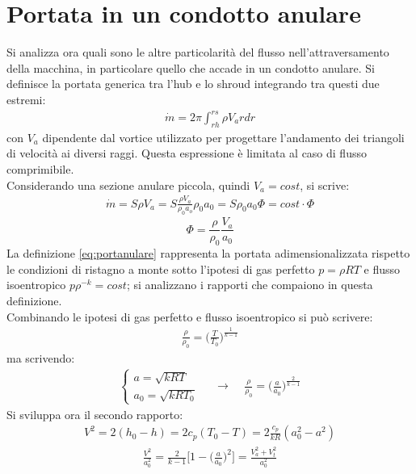 \section{Portata in un condotto anulare}
Si analizza ora quali sono le altre particolarità del flusso nell'attraversamento della macchina, in particolare quello che accade in un condotto anulare. Si definisce la portata generica tra l'hub e lo shroud integrando tra questi due estremi:
\begin{align*}
\dot{m} = 2 \pi \int_{rh}^{rs} \rho V_a r dr
\end{align*}
con $V_a$ dipendente dal vortice utilizzato per progettare l'andamento dei triangoli di velocità ai diversi raggi. Questa espressione è limitata al caso di flusso comprimibile.\\
Considerando una sezione anulare piccola, quindi $V_a = cost$, si scrive:
\begin{align*}
\dot{m} = S \rho V_a = S \frac{\rho V_a}{\rho_0 a_o}\rho_0 a_0 = S \rho_0 a_0 \Phi = cost \cdot \Phi
\end{align*}
\begin{equation}\label{eq:portanulare}
\Phi = \frac{\rho}{\rho_0} \frac{V_a}{a_0}
\end{equation}
La definizione \ref{eq:portanulare} rappresenta la portata adimensionalizzata rispetto le condizioni di ristagno a monte sotto l'ipotesi di gas perfetto $p = \rho RT$ e flusso isoentropico $p \rho^{-k} = cost$; si analizzano i rapporti che compaiono in questa definizione.\\
Combinando le ipotesi di gas perfetto e flusso isoentropico si può scrivere:
\begin{align*}
\frac{\rho}{\rho_0} = \bigg( \frac{T}{T_0} \bigg)^{\frac{1}{k-1}} 
\end{align*}
ma scrivendo:
\begin{align*}
\begin{cases}
a = \sqrt{kRT}\\
a_0 = \sqrt{kRT_0}
\end{cases}
\;\;\;\; \rightarrow \;\;\;\; \frac{\rho}{\rho_0} = \bigg( \frac{a}{a_0} \bigg)^{\frac{2}{k-1}}
\end{align*}
Si sviluppa ora il secondo rapporto:
\begin{align*}
V^2 = 2 (h_0 - h) = 2 c_p (T_0 - T) = 2 \frac{c_p}{kR} (a_0^2 - a^2)
\end{align*}
\begin{align*}
\frac{V^2}{a_0^2} = \frac{2}{k-1} \bigg[ 1- \bigg( \frac{a}{a_0} \bigg)^2 \bigg] = \frac{V_a^2 + V_t^2}{a_0^2}
\end{align*}

